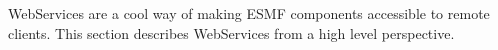 %


WebServices are a cool way of making ESMF components accessible to remote clients. 
This section describes WebServices from a high level perspective.
